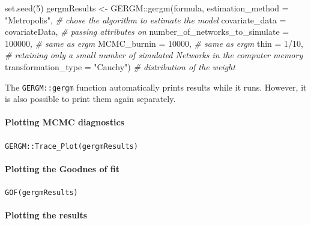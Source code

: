 \documentclass[
]{article}
\newenvironment{Shaded}{\begin{snugshade}}{\end{snugshade}}
\newcommand{\AttributeTok}[1]{\textcolor[rgb]{0.77,0.63,0.00}{#1}}
\newcommand{\CommentTok}[1]{\textcolor[rgb]{0.56,0.35,0.01}{\textit{#1}}}
\newcommand{\DecValTok}[1]{\textcolor[rgb]{0.00,0.00,0.81}{#1}}
\newcommand{\FunctionTok}[1]{\textcolor[rgb]{0.00,0.00,0.00}{#1}}
\newcommand{\NormalTok}[1]{#1}
\newcommand{\OtherTok}[1]{\textcolor[rgb]{0.56,0.35,0.01}{#1}}
\newcommand{\SpecialCharTok}[1]{\textcolor[rgb]{0.00,0.00,0.00}{#1}}
\newcommand{\StringTok}[1]{\textcolor[rgb]{0.31,0.60,0.02}{#1}}
\begin{document}
\begin{Shaded}
\begin{Highlighting}[]

\FunctionTok{set.seed}\NormalTok{(}\DecValTok{5}\NormalTok{)}
\NormalTok{gergmResults }\OtherTok{\textless{}{-}}\NormalTok{ GERGM}\SpecialCharTok{::}\FunctionTok{gergm}\NormalTok{(formula,}
                      \AttributeTok{estimation\_method =} \StringTok{"Metropolis"}\NormalTok{, }\CommentTok{\# chose the algorithm to estimate the model}
                      \AttributeTok{covariate\_data =}\NormalTok{ covariateData, }\CommentTok{\# passing attributes on}
                      \AttributeTok{number\_of\_networks\_to\_simulate =} \DecValTok{100000}\NormalTok{, }\CommentTok{\# same as ergm}
                      \AttributeTok{MCMC\_burnin =} \DecValTok{10000}\NormalTok{, }\CommentTok{\# same as ergm}
                      \AttributeTok{thin =} \DecValTok{1}\SpecialCharTok{/}\DecValTok{10}\NormalTok{, }\CommentTok{\# retaining only a small number of simulated Networks in the computer memory}
                      \AttributeTok{transformation\_type =} \StringTok{"Cauchy"}\NormalTok{) }\CommentTok{\# distribution of the weight}
\end{Highlighting}
\end{Shaded}

The \texttt{GERGM::gergm} function automatically prints results while it
runs. However, it is also possible to print them again separately.

\hypertarget{plotting-mcmc-diagnostics}{%
\paragraph{Plotting MCMC diagnostics}\label{plotting-mcmc-diagnostics}}

\texttt{GERGM::Trace\_Plot(gergmResults)}

\hypertarget{plotting-the-goodnes-of-fit}{%
\paragraph{Plotting the Goodnes of
fit}\label{plotting-the-goodnes-of-fit}}

\texttt{GOF(gergmResults)}

\hypertarget{plotting-the-results}{%
\paragraph{Plotting the results}\label{plotting-the-results}}
\end{document}

